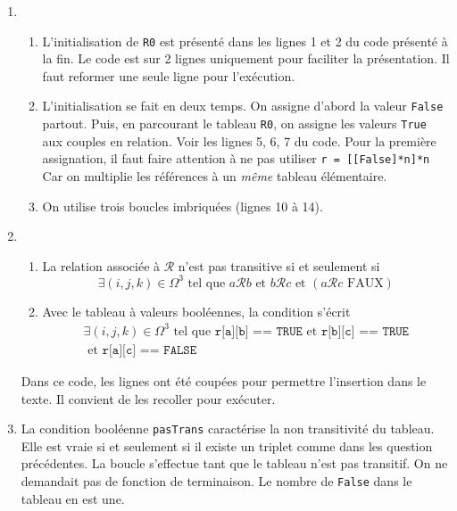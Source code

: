 
\begin{enumerate}
  \item 
\begin{enumerate}
  \item L'initialisation de \texttt{R0} est présenté dans les lignes 1 et 2 du code présenté à la fin. Le code est sur 2 lignes uniquement pour faciliter la présentation. Il faut reformer une seule ligne pour l'exécution.
  \item L'initialisation se fait en deux temps. On assigne d'abord la valeur \texttt{False} partout. Puis, en parcourant le tableau \texttt{R0}, on assigne les valeurs \texttt{True} aux couples en relation. Voir les lignes 5, 6, 7 du code.\newline
Pour la première assignation, il faut faire attention à ne pas utiliser\newline
\texttt{r = [[False]*n]*n}
Car on multiplie les références à un \emph{même} tableau élémentaire. 

  \item On utilise trois boucles imbriquées (lignes 10 à 14).
\end{enumerate}

  \item 
\begin{enumerate}
  \item La relation associée à $\mathcal{R}$ n'est pas transitive si et seulement si
\begin{displaymath}
 \exists (i,j,k) \in \Omega^3 \text{ tel que } a \mathcal{R} b \text{ et } b \mathcal{R} c \text{ et } \left( a \mathcal{R} c \text{ FAUX}\right) 
\end{displaymath}

  \item Avec le tableau à valeurs booléennes, la condition s'écrit
\begin{multline*}
 \exists (i,j,k) \in \Omega^3 \text{ tel que } \texttt{r[a][b] == TRUE} \text{ et } \texttt{r[b][c] == TRUE}\\ \text{ et } \texttt{r[a][c] == FALSE} 
\end{multline*}
\end{enumerate}
Dans ce code, les lignes ont été coupées pour permettre l'insertion dans le texte. Il convient de les recoller pour exécuter.

  \item La condition booléenne \texttt{pasTrans} caractérise la non transitivité du tableau. Elle est vraie si et seulement si il existe un triplet comme dans les question précédentes. La boucle s'effectue tant que le tableau n'est pas transitif. On ne demandait pas de fonction de terminaison. Le nombre de \texttt{False} dans le tableau en est une. 
  
\end{enumerate}
